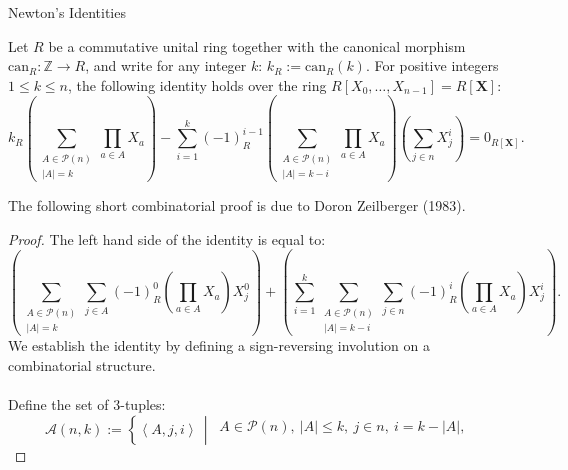 \begin{appendixitem}{Newton's Identities}
    \begin{theorem}
        Let \( R \) be a commutative unital ring together with the canonical morphism \( \mathrm{can}_R \colon \mathbb{Z} \to R \), and write for any integer \( k \): \( k_R := \mathrm{can}_R\left(k\right) \). For positive integers \( 1\leq k \leq n \), the following identity holds over the ring \( R\left[X_0,\ldots,X_{n-1}\right] = R\left[\mathbf{X}\right] \):
        \[
            k_R\left(\sum_{\substack{A \in \mathscr{P}\left(n\right) \\ \left|A\right| = k}} \prod_{a \in A} X_{a}\right) - \sum_{i=1}^{k} \left(-1\right)_R^{i-1} \left(\sum_{\substack{A \in \mathscr{P}\left(n\right) \\ \left|A\right| = k-i}} \prod_{a \in A} X_{a}\right) \left(\sum_{j \in n} X_j^{i}\right) = 0_{R\left[\mathbf{X}\right]}.
        \]
    \end{theorem}
    The following short combinatorial proof is due to Doron Zeilberger (1983).
    \begin{proof}
        The left hand side of the identity is equal to:
        \begin{equation}
            \label{eq:star} \tag{*} \left(\sum_{\substack{A \in \mathscr{P}\left(n\right) \\ \left|A\right| = k}} \sum_{j \in A} \left(-1\right)_R^{0} \left(\prod_{a \in A} X_a\right) X_j^0\right) + \left(\sum_{i=1}^{k} \sum_{\substack{A \in \mathscr{P}\left(n\right) \\ \left|A\right| = k-i}} \sum_{j \in n} \left(-1\right)_R^{i} \left(\prod_{a \in A} X_a\right) X_j^i\right).
        \end{equation}
        We establish the identity by defining a sign-reversing involution on a combinatorial structure.
        \\\\
        Define the set of \( 3 \)-tuples:
        \[
            \mathcal{A}\left(n, k\right) := \left\{ \left\langle A, j, i \right\rangle \,\middle|\,
            \begin{array}{l}
                A \in \mathscr{P}\left(n\right),\ \left|A\right| \leq k,\ j \in n,\ i = k - \left|A\right|,\ \\

\end{array}\]
\end{proof}
\end{appendixitem}
